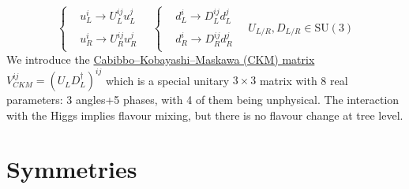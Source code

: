 \documentclass[../main.tex]{subfiles}
\begin{document}
\[
\left\{
\begin{aligned}
&u_L^i\xrightarrow[]{}U_L^{ij}u_L^j\\
&u_R^i\xrightarrow[]{}U_R^{ij}u_R^j
\end{aligned}
\right.
\quad
\left\{
\begin{aligned}
&d_L^i\xrightarrow[]{}D_L^{ij}d_L^j\\
&d_R^i\xrightarrow[]{}D_R^{ij}d_R^j
\end{aligned}
\right.
\quad
U_{L/R},D_{L/R}\in\text{SU}(3)
\]
We introduce the \href{https://en.wikipedia.org/wiki/Cabibbo-Kobayashi-Maskawa_matrix}{Cabibbo–Kobayashi–Maskawa (CKM) matrix}\\ $V_{CKM}^{ij}=(U_LD_L^\dagger)^{ij}$ which is a special unitary $3\times3$ matrix with 8 real parameters: 3 angles+5 phases, with 4 of them being unphysical. The interaction with the Higgs implies flavour mixing, but there is no flavour change at tree level.
\section{Symmetries}
\end{document}
